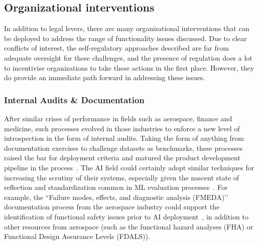 \documentclass[acmconf,manuscript,screen,natbib=true]{acmart}
\begin{document}
\subsection{Organizational interventions}



In addition to legal levers, there are many organizational interventions that can be deployed to address the range of functionality issues discussed. %
Due to clear conflicts of interest, the self-regulatory approaches described are far from adequate oversight for these challenges, and the presence of regulation does a lot to incentivise organizations to take these actions in the first place. However, they do provide an immediate path forward in addressing these issues. 

\subsubsection{Internal Audits \& Documentation}


After similar crises of performance in fields such as aerospace, finance and medicine, such processes evolved in those industries to enforce a new level of introspection in the form of internal audits. Taking the form of anything from documentation exercises to challenge datasets as benchmarks, these processes raised the bar for deployment criteria and matured the product development pipeline in the process~\cite{raji2020closing}. The AI field could certainly adopt similar techniques for increasing the scrutiny of their systems, especially given the nascent state of reflection and standardization common in ML evaluation processes~\cite{LiaoAreWe2021}. For example, the ``Failure modes, effects, and diagnostic analysis (FMEDA)’’ documentation process from the aerospace industry could support the identification of functional safety issues prior to AI deployment~\cite{raji2020closing}, in addition to other resources from aerospace (such as the functional hazard analyses (FHA) or Functional Design Assurance Levels (FDALS)). 
\end{document}
